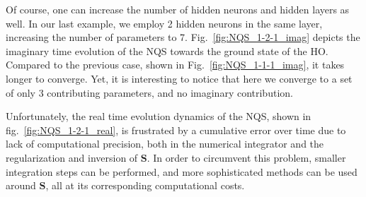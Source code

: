 \documentclass[aps,pre,superscriptaddress,amsmath,amssymb,amsfonts,twocolumn,showpacs,notitlepage]{revtex4-1}
\begin{document}
	Of course, one can increase the number of hidden neurons and hidden layers as well.
	In our last example, we employ 2 hidden neurons in the same layer, increasing the number of parameters to 7.
	Fig.~\ref{fig:NQS_1-2-1_imag} depicts the imaginary time evolution of the NQS towards the ground state of the HO.
	Compared to the previous case, shown in Fig.~\ref{fig:NQS_1-1-1_imag}, it takes longer to converge.
	Yet, it is interesting to notice that here we converge to a set of only 3 contributing parameters, and no imaginary contribution.
	
	Unfortunately, the real time evolution dynamics of the NQS, shown in fig.~\ref{fig:NQS_1-2-1_real}, is frustrated by a cumulative error over time due to lack of computational precision, both in the numerical integrator and the regularization and inversion of $\bm{S}$.
	In order to circumvent this problem, smaller integration steps can be performed, and more sophisticated methods can be used around $\bm{S}$, all at its corresponding computational costs.
	
\end{document}
